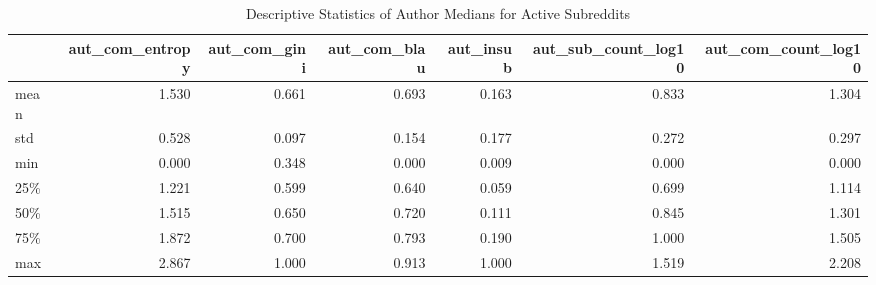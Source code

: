 \begin{table}
\centering
\begin{tabular}{lrrrrrr}
\toprule
{} &  aut\_com\_entropy &  aut\_com\_gini &  aut\_com\_blau &  aut\_insub &  aut\_sub\_count\_log10 &  aut\_com\_count\_log10 \\
\midrule
mean &            1.530 &         0.661 &         0.693 &      0.163 &                0.833 &                1.304 \\
std  &            0.528 &         0.097 &         0.154 &      0.177 &                0.272 &                0.297 \\
min  &            0.000 &         0.348 &         0.000 &      0.009 &                0.000 &                0.000 \\
25\%  &            1.221 &         0.599 &         0.640 &      0.059 &                0.699 &                1.114 \\
50\%  &            1.515 &         0.650 &         0.720 &      0.111 &                0.845 &                1.301 \\
75\%  &            1.872 &         0.700 &         0.793 &      0.190 &                1.000 &                1.505 \\
max  &            2.867 &         1.000 &         0.913 &      1.000 &                1.519 &                2.208 \\
\bottomrule
\end{tabular}
\caption{Descriptive Statistics of Author Medians for Active Subreddits}
\label{table/author-medians:active}
\end{table}